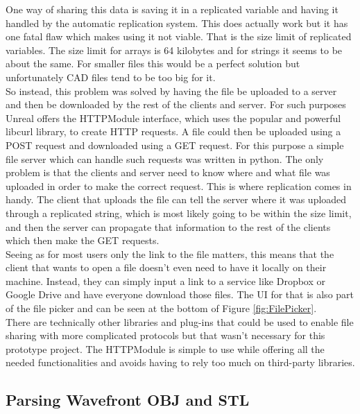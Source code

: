 One way of sharing this data is saving it in a replicated variable and having it handled by the automatic replication system. This does actually work but it has one fatal flaw which makes using it not viable. That is the size limit of replicated variables. The size limit for arrays is 64 kilobytes and for strings it seems to be about the same. For smaller files this would be a perfect solution but unfortunately \acs{CAD} files tend to be too big for it.\\
So instead, this problem was solved by having the file be uploaded to a server and then be downloaded by the rest of the clients and server. For such purposes Unreal offers the HTTPModule interface, which uses the popular and powerful libcurl library, to create \acs{HTTP} requests\cite{bib:UELibC}. A file could then be uploaded using a POST request and downloaded using a GET request. For this purpose a simple file server which can handle such requests was written in python. The only problem is that the clients and server need to know where and what file was uploaded in order to make the correct request. This is where replication comes in handy. The client that uploads the file can tell the server where it was uploaded through a replicated string, which is most likely going to be within the size limit, and then the server can propagate that information to the rest of the clients which then make the GET requests.\\
Seeing as for most users only the link to the file matters, this means that the client that wants to open a file doesn't even need to have it locally on their machine. Instead, they can simply input a link to a service like Dropbox or Google Drive and have everyone download those files. The UI for that is also part of the file picker and can be seen at the bottom of Figure \ref{fig:FilePicker}.\\
There are technically other libraries and plug-ins that could be used to enable file sharing with more complicated protocols but that wasn't necessary for this prototype project. The HTTPModule is simple to use while offering all the needed functionalities and avoids having to rely too much on third-party libraries.
\subsection{Parsing Wavefront OBJ and STL}

